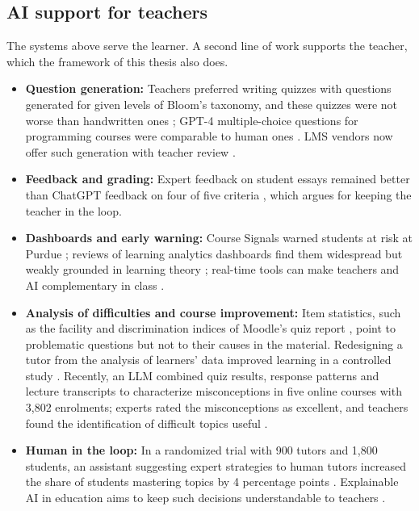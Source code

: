 \subsection{AI support for teachers}
\label{subsec-teacher-side}

The systems above serve the learner. A second line of work supports the
teacher, which the framework of this thesis also does.

\begin{itemize}
  \item \textbf{Question generation:} Teachers preferred writing quizzes
        with questions generated for given levels of Bloom's taxonomy,
        and these quizzes were not worse than handwritten ones
        \cite{elkins2024}; GPT-4 multiple-choice questions for programming
        courses were comparable to human ones \cite{doughty2024}. LMS
        vendors now offer such generation with teacher review
        \cite{d2l_lumi}.
  \item \textbf{Feedback and grading:} Expert feedback on student essays
        remained better than ChatGPT feedback on four of five criteria
        \cite{steiss2024}, which argues for keeping the teacher in the
        loop.
  \item \textbf{Dashboards and early warning:} Course Signals warned
        students at risk at Purdue \cite{arnold2012}; reviews of learning
        analytics dashboards find them widespread but weakly grounded in
        learning theory \cite{matcha2020}; real-time tools can make
        teachers and AI complementary in class \cite{holstein2019}.
  \item \textbf{Analysis of difficulties and course improvement:} Item
        statistics, such as the facility and discrimination indices of
        Moodle's quiz report \cite{moodle_quizstats,crocker1986}, point to
        problematic questions but not to their causes in the material.
        Redesigning a tutor from the analysis of learners' data improved
        learning in a controlled study \cite{koedinger2013}. Recently, an
        LLM combined quiz results, response patterns and lecture
        transcripts to characterize misconceptions in five online courses
        with 3,802 enrolments; experts rated the misconceptions as
        excellent, and teachers found the identification of difficult
        topics useful \cite{parker2026}.
  \item \textbf{Human in the loop:} In a randomized trial with 900 tutors
        and 1,800 students, an assistant suggesting expert strategies to
        human tutors increased the share of students mastering topics by
        4 percentage points \cite{wang2024tutorcopilot}. Explainable AI in
        education aims to keep such decisions understandable to teachers
        \cite{khosravi2022}.
\end{itemize}

